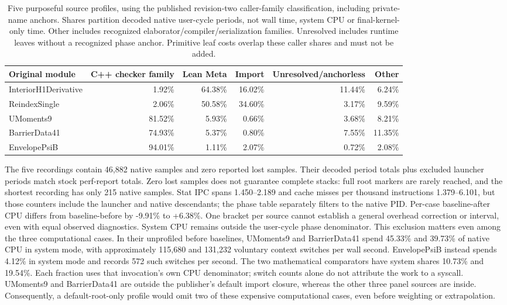 \documentclass[10pt,twocolumn]{article}
\begin{document}
\begin{table}[t]
\centering\small
\begin{tabular}{lrrrrr}
\toprule
Original module & C++ checker family & Lean Meta & Import &
Unresolved/anchorless & Other\\
\midrule
InteriorH1Derivative & 1.92\% & 64.38\% & 16.02\% & 11.44\% & 6.24\%\\
ReindexSingle & 2.06\% & 50.58\% & 34.60\% & 3.17\% & 9.59\%\\
UMoments9 & 81.52\% & 5.93\% & 0.66\% & 3.68\% & 8.21\%\\
BarrierData41 & 74.93\% & 5.37\% & 0.80\% & 7.55\% & 11.35\%\\
EnvelopePsiB & 94.01\% & 1.11\% & 2.07\% & 0.72\% & 2.08\%\\
\bottomrule
\end{tabular}
\caption{Five purposeful source profiles, using the published revision-two
caller-family classification, including private-name anchors. Shares partition decoded native user-cycle
periods, not wall time, system CPU or final-kernel-only time.
Other includes recognized elaborator/compiler/serialization families.
Unresolved includes runtime leaves without a recognized phase anchor.
Primitive leaf costs overlap these caller shares and must not be added.}
\label{tab:native-phase-panel}
\end{table}

The five recordings contain 46,882 native samples and zero reported lost
samples. Their decoded period totals plus excluded launcher periods match
stock perf-report totals.
Zero lost samples does not guarantee complete stacks: full root markers
are rarely reached, and the shortest recording has only 215 native samples.
Stat IPC spans 1.450--2.189 and cache misses per thousand instructions
1.379--6.101, but those counters include the launcher and native descendants;
the phase table separately filters to the native PID.
Per-case baseline-after CPU differs from baseline-before by -9.91\% to
+6.38\%. One bracket per source cannot establish a general overhead
correction or interval, even with equal observed diagnostics.
System CPU remains outside the user-cycle phase denominator.
This exclusion matters even among the three computational cases.
In their unprofiled before baselines, UMoments9 and BarrierData41 spend
45.33\% and 39.73\% of native CPU in system mode, with approximately
115,680 and 131,232 voluntary context switches per wall second.
EnvelopePsiB instead spends 4.12\% in system mode and records 572 such
switches per second. The two mathematical comparators have system shares
10.73\% and 19.54\%. Each fraction uses that invocation's own CPU
denominator; switch counts alone do not attribute the work to a syscall.
UMoments9 and BarrierData41 are outside the publisher's default import
closure, whereas the other three panel sources are inside.
Consequently, a default-root-only profile would omit two of these
expensive computational cases, even before weighting or extrapolation.
\end{document}
